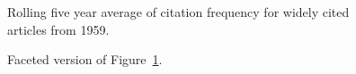 \documentclass[
  10pt,
  letterpaper,
  DIV=11,
  numbers=noendperiod,
  twoside]{scrartcl}
\begin{document}
\begin{figure}


\caption{\label{fig-citation-spaghetti-1959}Rolling five year average of
citation frequency for widely cited articles from 1959.}

\end{figure}%

\begin{figure}


\caption{\label{fig-citation-facet-1959}Faceted version of
Figure~\ref{fig-citation-spaghetti-1959}.}

\end{figure}%
\end{document}
